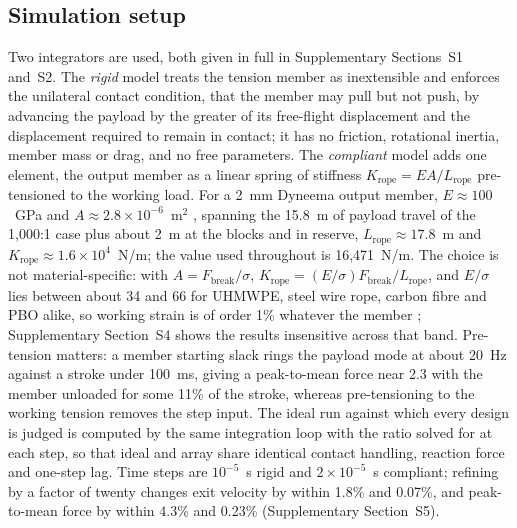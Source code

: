 \documentclass[preprint,12pt,number]{elsarticle}
\newcommand{\Krope}{K_{\mathrm{rope}}}
\newcommand{\Lrope}{L_{\mathrm{rope}}}
\newcommand{\ptm}{peak-to-mean}
\begin{document}
\subsection{Simulation setup}
\label{sec:setup}

Two integrators are used, both given in full in Supplementary Sections~S1 and~S2. The \emph{rigid} model treats the tension member as inextensible and enforces the unilateral contact condition, that the member may pull but not push, by advancing the payload by the greater of its free-flight displacement and the displacement required to remain in contact; it has no friction, rotational inertia, member mass or drag, and no free parameters. The \emph{compliant} model adds one element, the output member as a linear spring of stiffness $\Krope = EA/\Lrope$ pre-tensioned to the working load. For a 2~mm Dyneema output member, $E \approx 100$~GPa and $A \approx 2.8\times10^{-6}$~m$^2$ \citep{marlow,mckenna2004}, spanning the 15.8~m of payload travel of the 1,000:1 case plus about 2~m at the blocks and in reserve, $\Lrope \approx 17.8$~m and $\Krope \approx 1.6\times10^4$~N/m; the value used throughout is 16,471~N/m. The choice is not material-specific: with $A = F_{\mathrm{break}}/\sigma$, $\Krope = (E/\sigma)F_{\mathrm{break}}/\Lrope$, and $E/\sigma$ lies between about 34 and 66 for UHMWPE, steel wire rope, carbon fibre and PBO alike, so working strain is of order 1\% whatever the member \citep{davies2011}; Supplementary Section~S4 shows the results insensitive across that band. Pre-tension matters: a member starting slack rings the payload mode at about 20~Hz against a stroke under 100~ms, giving a \ptm{} force near 2.3 with the member unloaded for some 11\% of the stroke, whereas pre-tensioning to the working tension removes the step input. The ideal run against which every design is judged is computed by the same integration loop with the ratio solved for at each step, so that ideal and array share identical contact handling, reaction force and one-step lag. Time steps are $10^{-5}$~s rigid and $2\times10^{-5}$~s compliant; refining by a factor of twenty changes exit velocity by within 1.8\% and 0.07\%, and \ptm{} force by within 4.3\% and 0.23\% (Supplementary Section~S5).
\end{document}

